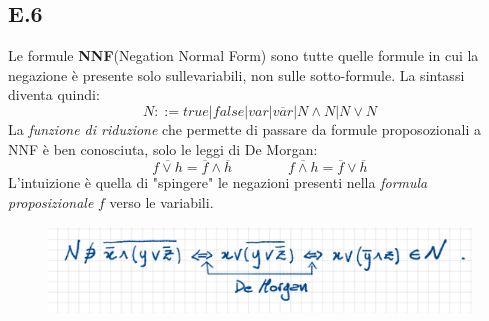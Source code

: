 \documentclass[a4paper]{article}
\begin{document}
\subsection{E.6}
Le formule \textbf{NNF}(Negation Normal Form) sono tutte quelle formule in cui la negazione è presente solo sullevariabili, non sulle sotto-formule.
La sintassi diventa quindi:
$$ N ::= true|false|var|\overline{var}|N \land N|N \lor N$$
La \textit{funzione di riduzione} che permette di passare da formule proposozionali a NNF è ben conosciuta, solo le leggi di De Morgan:
$$ \overline{f \lor h} = \overline{f} \land \overline{h} \qquad \qquad \overline{f \land h} = \overline{f} \lor \overline{h}$$
L'intuizione è quella di "spingere" le negazioni presenti nella \textit{formula proposizionale} $f$ verso le variabili.\\
\begin{figure}[!ht]
                \centering
                \includegraphics[width = 1\textwidth]{./img/E6.png}
\end{figure}\\
\end{document}
